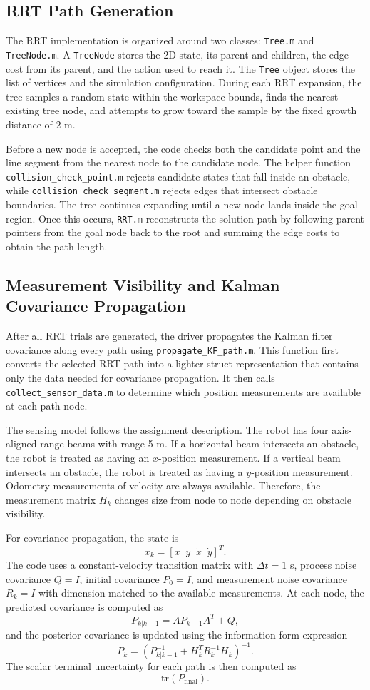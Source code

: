 \documentclass[11pt]{article}
\begin{document}
\subsection{RRT Path Generation}
The RRT implementation is organized around two classes: \texttt{Tree.m} and
\texttt{TreeNode.m}. A \texttt{TreeNode} stores the 2D state, its parent and
children, the edge cost from its parent, and the action used to reach it. The
\texttt{Tree} object stores the list of vertices and the simulation
configuration. During each RRT expansion, the tree samples a random state
within the workspace bounds, finds the nearest existing tree node, and attempts
to grow toward the sample by the fixed growth distance of 2 m.

Before a new node is accepted, the code checks both the candidate point and the
line segment from the nearest node to the candidate node. The helper function
\texttt{collision\_check\_point.m} rejects candidate states that fall inside an
obstacle, while \texttt{collision\_check\_segment.m} rejects edges that
intersect obstacle boundaries. The tree continues expanding until a new node
lands inside the goal region. Once this occurs, \texttt{RRT.m} reconstructs the
solution path by following parent pointers from the goal node back to the root
and summing the edge costs to obtain the path length.

\subsection{Measurement Visibility and Kalman Covariance Propagation}
After all RRT trials are generated, the driver propagates the Kalman filter
covariance along every path using \texttt{propagate\_KF\_path.m}. This function
first converts the selected RRT path into a lighter struct representation that
contains only the data needed for covariance propagation. It then calls
\texttt{collect\_sensor\_data.m} to determine which position measurements are
available at each path node.

The sensing model follows the assignment description. The robot has four
axis-aligned range beams with range 5 m. If a horizontal beam intersects an
obstacle, the robot is treated as having an $x$-position measurement. If a
vertical beam intersects an obstacle, the robot is treated as having a
$y$-position measurement. Odometry measurements of velocity are always
available. Therefore, the measurement matrix $H_k$ changes size from node to
node depending on obstacle visibility.

For covariance propagation, the state is
\[
    x_k = [x\;\; y\;\; \dot{x}\;\; \dot{y}]^T.
\]
The code uses a constant-velocity transition matrix with $\Delta t = 1$ s,
process noise covariance $Q=I$, initial covariance $P_0=I$, and measurement
noise covariance $R_k=I$ with dimension matched to the available measurements.
At each node, the predicted covariance is computed as
\[
    P_{k|k-1} = A P_{k-1} A^T + Q,
\]
and the posterior covariance is updated using the information-form expression
\[
    P_k =
    \left(P_{k|k-1}^{-1} + H_k^T R_k^{-1} H_k\right)^{-1}.
\]
The scalar terminal uncertainty for each path is then computed as
\[
    \mathrm{tr}(P_{\mathrm{final}}).
\]
\end{document}
